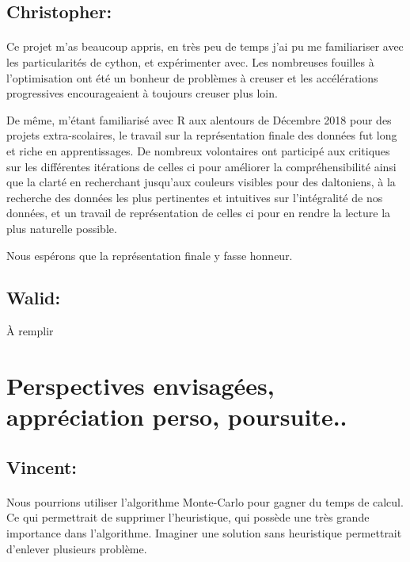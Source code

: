 \documentclass[
	headsepline=on,
	footsepline=on,
	twoside=off,
	abstract=on,
	DIV=10
]{scrreprt}
\begin{document}
				\subsection{Christopher:} 
				\paragraph{}
				Ce projet m'as beaucoup appris, en très peu de temps j'ai pu me familiariser avec les particularités de cython, et expérimenter avec.
				Les nombreuses fouilles à l'optimisation ont été un bonheur de problèmes à creuser et les accélérations progressives encourageaient à toujours creuser plus loin.
				
				De même, m'étant familiarisé avec R aux alentours de Décembre 2018 pour des projets extra-scolaires, le travail sur la représentation finale des données fut long et riche en apprentissages.
				De nombreux volontaires ont participé aux critiques sur les différentes itérations de celles ci pour améliorer la compréhensibilité ainsi que la clarté en recherchant jusqu'aux couleurs visibles pour des daltoniens, à la recherche des données les plus pertinentes et intuitives sur l'intégralité de nos données, et un travail de représentation de celles ci pour en rendre la lecture la plus naturelle possible. 
				
				Nous espérons que la représentation finale y fasse honneur.
	 
				\subsection{Walid:} À remplir
						
			\section{Perspectives envisagées, appréciation perso, poursuite..}

				 
				\subsection{Vincent: } 
				\paragraph{}
				Nous pourrions utiliser l'algorithme Monte-Carlo pour gagner du temps de calcul. 
				Ce qui permettrait de supprimer l'heuristique, qui possède une très grande importance dans l'algorithme. 
				Imaginer une solution sans heuristique permettrait d'enlever plusieurs problème.
				
\end{document}
